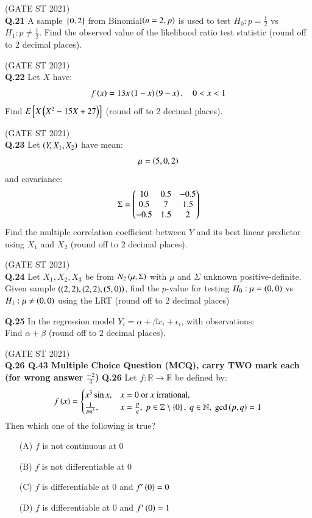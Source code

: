 \documentclass[journal,12pt,onecolumn]{IEEEtran}
\theoremstyle{remark}
\begin{document}
\hfill (GATE ST 2021) \\

\textbf{Q.21}
A sample ${}\left[0,2\right]$ from Binomial$\left(n=2,p\right)$ is used to test $H_0: p = \frac12$ vs $H_1: p \ne \frac12$.  
Find the observed value of the likelihood ratio test statistic (round off to 2 decimal places).

\hfill (GATE ST 2021) \\

\textbf{Q.22}
Let $X$ have:
\[
f\left(x\right) = 13x\left(1-x\right)\left(9-x\right), \quad 0 < x < 1
\]
Find $E{}\left[ X\left(X^2 - 15X + 27\right)\right]$ (round off to 2 decimal places).

\hfill (GATE ST 2021) \\

\textbf{Q.23}
Let $\left(Y, X_1, X_2\right)$ have mean:
\[
\mu = \left(5,0,2\right)
\]
and covariance:
\[
\Sigma =
\begin{pmatrix}
10 & 0.5 & -0.5 \\
0.5 & 7 & 1.5 \\
-0.5 & 1.5 & 2\end{pmatrix}
\]
Find the multiple correlation coefficient between $Y$ and its best linear predictor using $X_1$ and $X_2$ (round off to 2 decimal places).

\hfill (GATE ST 2021) \\

\textbf{Q.24}
Let $X_1, X_2, X_3$ be from $N_2\left(\mu, \Sigma\right)$ with $\mu$ and $\Sigma$ unknown positive-definite.  
Given sample $\left((2,2), (2,2), (5,0)\right)$, find the $p$-value for testing $H_0: \mu = \left(0,0\right)$ vs $H_1: \mu \neq \left(0,0\right)$ using the LRT (round off to 2 decimal places)

\textbf{Q.25}
In the regression model $Y_i = \alpha + \beta x_i + \epsilon_i$,  
with observations: \\
 
\bigskip
Find $\alpha + \beta$ (round off to 2 decimal places).

\hfill (GATE ST 2021) \\

\textbf{Q.26 \text{-} Q.43 Multiple Choice Question (MCQ), carry TWO mark each (for wrong answer $\frac{-2}{3}$)}
\textbf{Q.26}
Let $f: \mathbb{R} \to \mathbb{R}$ be defined by:
\[
f\left(x\right) =
\begin{cases}
x^3 \sin x, & x = 0 \ \text{or $x$ irrational}, \\
\frac{1}{p q^3}, & x = \frac{p}{q}, \ p \in \mathbb{Z} \setminus \left\{0\right\}, \ q \in \mathbb{N}, \ \gcd\left(p,q\right) = 1
\end{cases}
\]
Then which one of the following is true?
\begin{enumerate}
\item[(A)] $f$ is not continuous at $0$
\item[(B)] $f$ is not differentiable at $0$
\item[(C)] $f$ is differentiable at $0$ and $f'\left(0\right) = 0$
\item[(D)] $f$ is differentiable at $0$ and $f'\left(0\right) = 1$
\end{enumerate}
\end{document}
